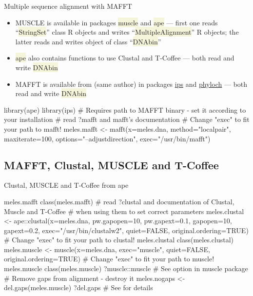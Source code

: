 \documentclass[compress, ucs, xelatex, 11pt, xcolor=svgnames, aspectratio=169,
	hyperref={
		bookmarks=true,
		unicode=true,
		colorlinks=true,
		pdftitle={Molecular data in R},
		plainpages=false,
		pdfauthor={Vojtech Zeisek},
		pdfsubject={Course about phylogeny and evolution in R},
		pdfcreator={XeLaTeX},
		pdfkeywords={R, evolution, phylogeny, molecular data},
		linkcolor=Crimson, %
		anchorcolor=Magenta, %
		citecolor=Magenta, %
		filecolor=Magenta, %
		menucolor=Magenta, %
		urlcolor=DodgerBlue, %
		pdftex},
	url={hyphens, lowtilde} %
	]{beamer}
\renewcommand{\texttt}[1]{\colorbox{Beige}{{\ttfamily #1}}}
\begin{document}
\begin{frame}[fragile]{Multiple sequence alignment with MAFFT}
	\begin{itemize}
		\item MUSCLE is available in packages \texttt{muscle} and \texttt{ape} --- first one reads \enquote{\texttt{*StringSet}} class R objects and writes \enquote{\texttt{*MultipleAlignment}} R objects; the latter reads and writes object of class \enquote{\texttt{DNAbin}}
		\item \texttt{ape} also contains functions to use Clustal and T-Coffee --- both read and write \texttt{DNAbin}
		\item MAFFT is available from (same author) in packages \href{https://CRAN.R-project.org/package=ips}{ips} and \href{http://www.christophheibl.de/Rpackages.html}{phyloch} --- both read and write \texttt{DNAbin}
	\end{itemize}
	\begin{spluscode}
    library(ape)
    library(ips)
    # Requires path to MAFFT binary - set it according to your installation
    # read ?mafft and mafft's documentation
    # Change "exec" to fit your path to mafft!
    meles.mafft <- mafft(x=meles.dna, method="localpair", maxiterate=100,
      options="--adjustdirection", exec="/usr/bin/mafft")
	\end{spluscode}
\end{frame}

\subsection{MAFFT, Clustal, MUSCLE and T-Coffee}

\begin{frame}[fragile]{Clustal, MUSCLE and T-Coffee from ape}
	\begin{spluscode}
    meles.mafft
    class(meles.mafft)
    # read ?clustal and documentation of Clustal, Muscle and T-Coffee
    # when using them to set correct parameters
    meles.clustal <- ape::clustal(x=meles.dna, pw.gapopen=10, pw.gapext=0.1,
      gapopen=10, gapext=0.2, exec="/usr/bin/clustalw2", quiet=FALSE,
      original.ordering=TRUE) # Change "exec" to fit your path to clustal!
    meles.clustal
    class(meles.clustal)
    meles.muscle <- muscle(x=meles.dna, exec="muscle", quiet=FALSE,
      original.ordering=TRUE) # Change "exec" to fit your path to muscle!
    meles.muscle
    class(meles.muscle)
    ?muscle::muscle # See option in muscle package
    # Remove gaps from alignment - destroy it
    meles.nogaps <- del.gaps(meles.muscle)
    ?del.gaps # See for details
	\end{spluscode}
\end{frame}
\end{document}
